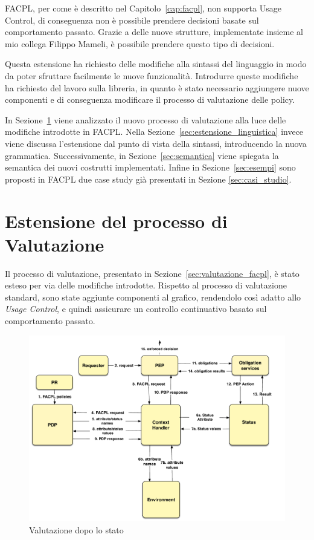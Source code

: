 \label{cap:usagecontrolfacpl}

\ac{FACPL}, per come è descritto nel Capitolo~\ref{cap:facpl}, non supporta Usage Control, di conseguenza non è possibile prendere decisioni basate sul comportamento passato. Grazie a delle nuove strutture, implementate insieme al mio collega Filippo Mameli, è possibile prendere questo tipo di decisioni.

Questa estensione ha richiesto delle modifiche alla sintassi del linguaggio in modo da poter sfruttare facilmente le nuove funzionalità. Introdurre queste modifiche ha richiesto del lavoro sulla libreria, in quanto è stato necessario aggiungere nuove componenti e di conseguenza modificare il processo di valutazione delle policy.

In Sezione~\ref{sec:estensione_del_processo_di_valutazione} viene analizzato il nuovo processo di valutazione alla luce delle modifiche introdotte in \ac{FACPL}.
Nella Sezione~\ref{sec:estensione_linguistica} invece viene discussa l'estensione dal punto di vista della sintassi, introducendo la nuova grammatica.
Successivamente, in Sezione~\ref{sec:semantica} viene spiegata la semantica dei nuovi costrutti implementati. Infine in Sezione~\ref{sec:esempi} sono proposti in \ac{FACPL} due case study già presentati in Sezione \ref{sec:casi_studio}.

\section{Estensione del processo di Valutazione} %
\label{sec:estensione_del_processo_di_valutazione}
Il processo di valutazione, presentato in Sezione~\ref{sec:valutazione_facpl}, è stato esteso per via delle modifiche introdotte. 
Rispetto al processo di valutazione standard, sono state aggiunte
componenti al grafico, rendendolo così adatto allo \textit{Usage Control}, e quindi assicurare un controllo continuativo basato sul comportamento passato.
\begin{figure}[h]
 \centering 
	\includegraphics[scale = 0.49]{./Chapters/Image/evalvect.pdf}
 \caption{Valutazione dopo lo stato}
 \label{fig:evalStatus}
\end{figure}

